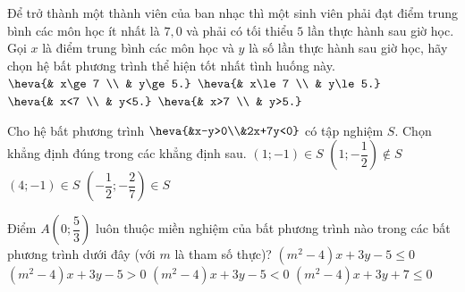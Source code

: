 \begin{ex}%
	Để trở thành một thành viên của ban nhạc thì một sinh viên phải đạt điểm trung bình các môn học ít nhất là $7{,}0$ và phải có tối thiểu $5$ lần thực hành sau giờ học. Gọi $x$ là điểm trung bình các môn học và $y$ là số lần thực hành sau giờ học, hãy chọn hệ bất phương trình thể hiện tốt nhất tình huống này.
	\def\dotEX{}
	\choice
	{\True $\heva{& x\ge 7 \\ & y\ge 5.}$}
	{$\heva{& x\le 7 \\ & y\le 5.}$}
	{$\heva{& x<7 \\ & y<5.}$}
	{$\heva{& x>7 \\ & y>5.}$}
\end{ex}

\begin{ex}%
	Cho hệ bất phương trình $\heva{&x-y>0\\&2x+7y<0}$ có tập nghiệm $S$. Chọn khẳng định đúng trong các khẳng định sau.
	\choice
	{\True $(1;-1)\in S$}
	{$(1;-\dfrac{1}{2})\notin S$}
	{$(4;-1)\in S$}
	{$(-\dfrac{1}{2};-\dfrac{2}{7})\in S$}
\end{ex}

\begin{ex}%
	Điểm $A\left (0;\dfrac{5}{3}\right )$ luôn thuộc miền nghiệm của bất phương trình nào trong các bất phương trình dưới đây (với $m$ là tham số thực)?
	\choice
	{\True $(m^2-4)x+3y-5\leq 0$}
	{$(m^2-4)x+3y-5> 0$}
	{$(m^2-4)x+3y-5< 0$}
	{$(m^2-4)x+3y+7\leq 0$}
\end{ex}

